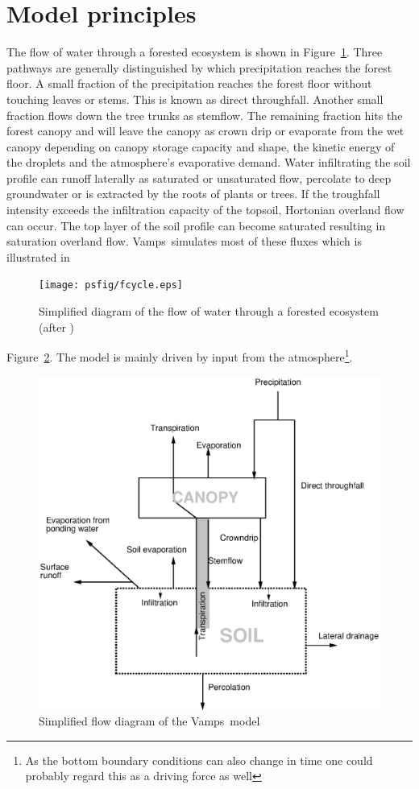 \documentclass[11pt]{book}
\newcommand{\vamps}{{\sf Vamps}}
\begin{document}
\section*{Model principles}
The flow of water through a forested ecosystem is shown in
Figure~\ref{fig:fcycle}. Three pathways are generally distinguished
by which precipitation reaches the forest floor. A small fraction of
the precipitation reaches the forest floor without touching leaves or
stems. This is known as direct throughfall. Another small fraction
flows down the tree trunks as stemflow. The remaining fraction hits
the forest canopy and will leave the canopy as crown drip or evaporate
from the wet canopy depending on canopy storage capacity and shape, the
kinetic energy of the droplets and the atmosphere's evaporative demand.
Water infiltrating the soil profile can runoff laterally as saturated
or unsaturated flow, percolate to deep groundwater or is extracted
by the roots of plants or trees. If the troughfall intensity exceeds
the infiltration capacity of the topsoil, Hortonian overland flow can
occur. The top layer of the soil profile can become saturated resulting
in saturation overland flow. \vamps\ simulates most of these fluxes
which is illustrated in
\begin{figure}
\centerline{\texttt{[image: psfig/fcycle.eps]}}
\caption{Simplified diagram of the flow of water through a forested
ecosystem (after \protect{})}
\label{fig:fcycle}
\end{figure}
Figure~\ref{fig:vflow}.
The model is mainly driven by input from the atmosphere\footnote{As the
bottom boundary conditions can also change in time one could probably
regard this as a driving force as well}.
\begin{figure}
\centerline{\includegraphics{psfig/vflow.eps}}
\caption{Simplified flow diagram of the \vamps\ model}
\label{fig:vflow}
\end{figure}
\end{document}
